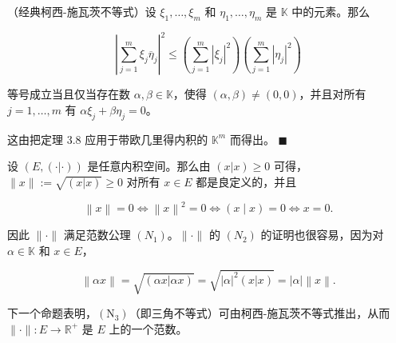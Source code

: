 \begin{corollary}

（经典柯西-施瓦茨不等式）设 $ \xi_1, \ldots, \xi_m $ 和 $ \eta_1, \ldots, \eta_m $ 是 $ \mathbb{K} $ 中的元素。那么

\begin{equation}
\left|\sum_{j=1}^{m}\xi_{j}\overline{\eta}_{j}\right|^{2}\leq\left(\sum_{j=1}^{m}|\xi_{j}|^{2}\right)\left(\sum_{j=1}^{m}|\eta_{j}|^{2}\right)
\end{equation}

等号成立当且仅当存在数 $\alpha, \beta \in \mathbb{K}$，使得 $(\alpha, \beta) \neq (0, 0)$，并且对所有 $j = 1, \ldots, m$ 有 $\alpha \xi_j + \beta \eta_j = 0$。

\proofhead
这由把定理 3.8 应用于带欧几里得内积的 $ \mathbb{K}^m $ 而得出。 $ \blacksquare $
\end{corollary}

设 $ (E, (\cdot|\cdot)) $ 是任意内积空间。那么由 $ (x|x) \geq 0 $ 可得，$ \|x\| := \sqrt{(x|x)} \geq 0 $ 对所有 $ x \in E $ 都是良定义的，并且

\[
\left\|x\right\|=0\Longleftrightarrow\left\|x\right\|^{2}=0\Longleftrightarrow\left(x\mid x\right)=0\Longleftrightarrow x=0.
\]

因此 $ \|\cdot\| $ 满足范数公理 $ (N_1) $。$ \|\cdot\| $ 的 $ (N_2) $ 的证明也很容易，因为对 $ \alpha \in \mathbb{K} $ 和 $ x \in E $，

\[
\left\|\alpha x\right\|=\sqrt{\left(\alpha x\left|\alpha x\right.\right)}=\sqrt{\left|\alpha\right|^{2}\left(x\left|x\right.\right)}=\left|\alpha\right|\left\|x\right\|.
\]

下一个命题表明，$ (\mathrm{N}_3) $（即三角不等式）可由柯西-施瓦茨不等式推出，从而 $ \|\cdot\|: E \to \mathbb{R}^+ $ 是 $ E $ 上的一个范数。

